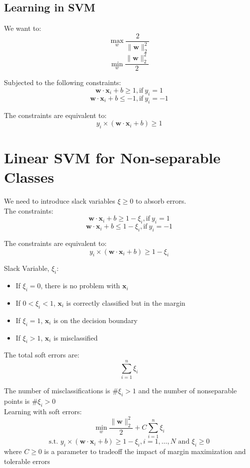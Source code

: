 \begin{multicols*}{2}
\subsection{Learning in SVM}

\noindent We want to:
$$\!\max_w \frac{2}{\| \mathbf{w} \|_2^2}$$
$$\!\min_w \frac{\| \mathbf{w} \|_2^2}{2}$$

\noindent Subjected to the following constraints:
$$\mathbf{w} \cdot \mathbf{x}_i + b \ge 1, \text{if}\ y_i=1$$
$$\mathbf{w} \cdot \mathbf{x}_i + b \le -1, \text{if}\ y_i=-1$$

\noindent The constraints are equivalent to:
$$y_i \times (\mathbf{w} \cdot \mathbf{x}_i + b) \ge 1$$

\section{Linear SVM for Non-separable Classes}

\noindent We need to introduce slack variables $\xi \ge 0$ to absorb errors. \\

\noindent The constraints:
$$\mathbf{w} \cdot \mathbf{x}_i + b \ge 1 - \xi_i, \text{if}\ y_i=1$$
$$\mathbf{w} \cdot \mathbf{x}_i + b \le 1 - \xi_i, \text{if}\ y_i=-1$$

\noindent The constraints are equivalent to:
$$y_i \times (\mathbf{w} \cdot \mathbf{x}_i + b) \ge 1 - \xi_i$$

\noindent Slack Variable, $\xi_i$:
\begin{itemize}
    \item If $\xi_i=0$, there is no problem with $\mathbf x_i$
    \item If $0<\xi_i<1$, $\mathbf x_i$ is correctly classified but in the margin
    \item If $\xi_i=1$, $\mathbf x_i$ is on the decision boundary
    \item If $\xi_i>1$, $\mathbf x_i$ is misclassified
\end{itemize}

\noindent The total soft errors are:
$$\sum_{i=1}^n \xi_i$$

\noindent The number of misclassifications is \#{$\xi_i > 1$} and the number of nonseparable points is \#{$\xi_i > 0$} \\

\noindent Learning with soft errors:
$$\!\min_w \frac{\| \mathbf{w} \|_2^2}{2} + C \sum_{i=1}^n \xi_i$$
$$\text{s.t. } y_i \times (\mathbf{w} \cdot \mathbf{x}_i + b) \ge 1 - \xi_i, i=1,\ldots,N \text{ and } \xi_i \ge 0$$
\noindent where $C \ge 0$ is a parameter to tradeoff the impact of margin maximization and tolerable errors

\end{multicols*}
